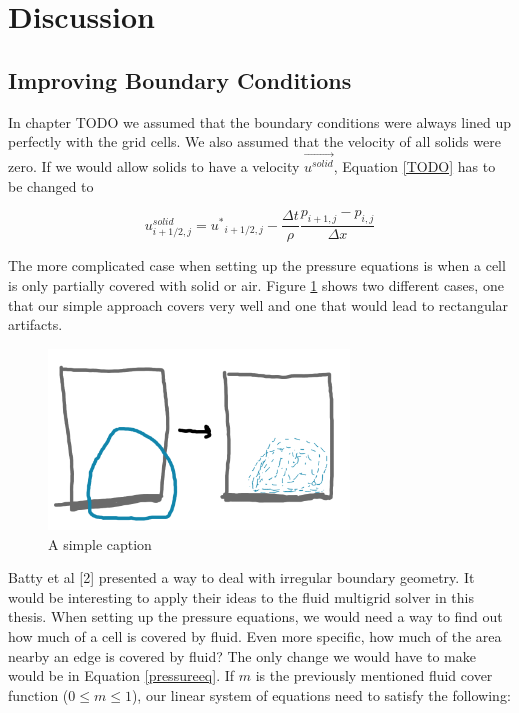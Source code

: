 \section{Discussion}
\subsection{Improving Boundary Conditions}
In chapter TODO we assumed that the boundary conditions were always lined up perfectly with the grid cells. We also assumed that the velocity of all solids were zero. If we would allow solids to have a velocity $\vec{u^{solid}}$, Equation \ref{TODO} has to be changed to

\begin{equation}
u^{solid}_{i+1/2,j}  = {u^*}_{i+1/2,j} - \frac{\Delta t }{\rho}\frac{p_{i+1,j} - p_{i,j}}{\Delta x}
\end{equation}

The more complicated case when setting up the pressure equations is when a cell is only partially covered with solid or air. Figure \ref{boundarycases} shows two different cases, one that our simple approach covers very well and one that would lead to rectangular artifacts.

\begin{figure}[ht!]
\centering
\includegraphics[width=80mm]{ch3/create.png}
\caption{A simple caption}
\label{boundarycases}
\end{figure}

Batty et al [2] presented a way to deal with irregular boundary geometry. It would be interesting to apply their ideas to the fluid multigrid solver in this thesis. When setting up the pressure equations, we would need a way to find out how much of a cell is covered by fluid. Even more specific, how much of the area nearby an edge is covered by fluid? The only change we would have to make would be in Equation \ref{pressureeq}. If $m$ is the previously mentioned fluid cover function ($0 \leq m \leq 1$), our linear system of equations need to satisfy the following:

